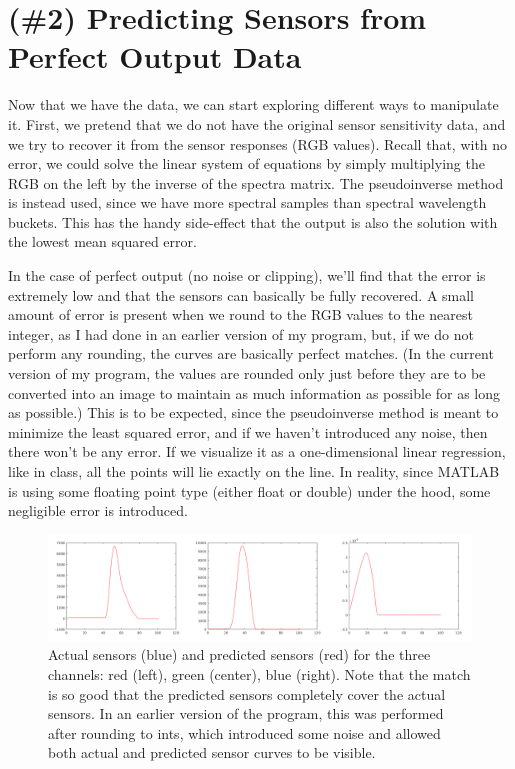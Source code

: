 \documentclass{article}
\begin{document}
\section{(\#2) Predicting Sensors from Perfect Output Data}

Now that we have the data, we can start exploring different ways to manipulate it. 
First, we pretend that we do not have the original sensor sensitivity data, and 
we try to recover it from the sensor responses (RGB values). Recall that, with 
no error, we could solve the linear system of equations by simply multiplying 
the RGB on the left by the inverse of the spectra matrix. The pseudoinverse 
method is instead used, since we have more spectral samples than spectral 
wavelength buckets. This has the handy side-effect that the output is also the 
solution with the lowest mean squared error.

In the case of perfect output (no noise or clipping), we'll find that the error 
is extremely low and that the sensors can basically be fully recovered. A small 
amount of error is present when we round to the RGB values to the nearest 
integer, as I had done in an earlier version of my program, but, if we do not 
perform any rounding, the curves are basically perfect 
matches. (In the current version of my program, the values are rounded only just 
before they are to be converted into an image to maintain as much information as 
possible for as long as possible.) This is to be expected, since the pseudoinverse method is meant to 
minimize the least squared error, and if we haven't introduced any noise, then 
there won't be any error. If we visualize it as a one-dimensional linear 
regression, like in class, all the points will lie exactly on the line. In reality, 
since MATLAB is using some floating point type (either float or double) under 
the hood, some negligible error is introduced.

\begin{figure}[!ht]
	\centering
	\includegraphics[width=160mm]{figs/sensors_perfect_chanall.png}
	\caption{Actual sensors (blue) and predicted sensors (red) for the three 
        channels: red (left), green (center), blue (right). Note that the match 
        is so good that the predicted sensors completely cover the actual sensors. 
        In an earlier version of the program, this was performed after rounding 
        to ints, which introduced some noise and allowed both actual and 
        predicted sensor curves to be visible.}
\end{figure}
\end{document}
